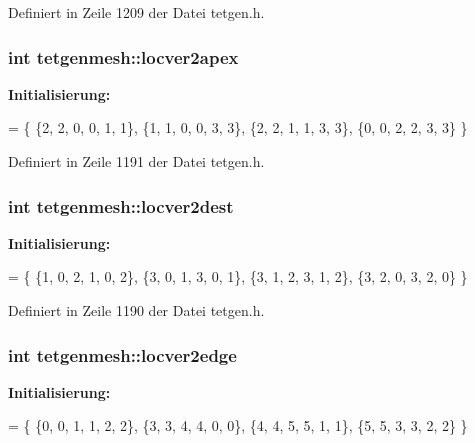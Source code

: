 Definiert in Zeile 1209 der Datei tetgen.\-h.

\hypertarget{classtetgenmesh_a3ea450afa31311d7e1563db4168eae31}{
\subsubsection[{locver2apex}]{\setlength{\rightskip}{0pt plus 5cm}int tetgenmesh\-::locver2apex\hspace{0.3cm}{\ttfamily [static]}}}\label{classtetgenmesh_a3ea450afa31311d7e1563db4168eae31}
{\bfseries Initialisierung\-:}
\begin{DoxyCode}
= \{ 
  \{2, 2, 0, 0, 1, 1\},
  \{1, 1, 0, 0, 3, 3\},
  \{2, 2, 1, 1, 3, 3\},
  \{0, 0, 2, 2, 3, 3\}
\}
\end{DoxyCode}


Definiert in Zeile 1191 der Datei tetgen.\-h.

\hypertarget{classtetgenmesh_a5920534e381e2c715dd0b1c5e7b61c9f}{
\subsubsection[{locver2dest}]{\setlength{\rightskip}{0pt plus 5cm}int tetgenmesh\-::locver2dest\hspace{0.3cm}{\ttfamily [static]}}}\label{classtetgenmesh_a5920534e381e2c715dd0b1c5e7b61c9f}
{\bfseries Initialisierung\-:}
\begin{DoxyCode}
= \{ 
  \{1, 0, 2, 1, 0, 2\},
  \{3, 0, 1, 3, 0, 1\},
  \{3, 1, 2, 3, 1, 2\},
  \{3, 2, 0, 3, 2, 0\}
\}
\end{DoxyCode}


Definiert in Zeile 1190 der Datei tetgen.\-h.

\hypertarget{classtetgenmesh_ac76a114f95d60ecb26c54a41de588cba}{
\subsubsection[{locver2edge}]{\setlength{\rightskip}{0pt plus 5cm}int tetgenmesh\-::locver2edge\hspace{0.3cm}{\ttfamily [static]}}}\label{classtetgenmesh_ac76a114f95d60ecb26c54a41de588cba}
{\bfseries Initialisierung\-:}
\begin{DoxyCode}
= \{
  \{0, 0, 1, 1, 2, 2\},
  \{3, 3, 4, 4, 0, 0\},
  \{4, 4, 5, 5, 1, 1\},
  \{5, 5, 3, 3, 2, 2\}
\}
\end{DoxyCode}


